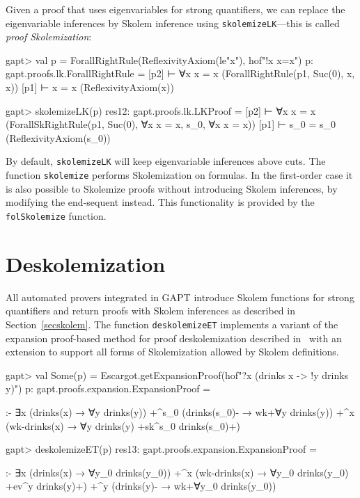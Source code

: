 \documentclass[a4paper,11pt]{book}
\begin{document}
Given a proof that uses eigenvariables for strong quantifiers, we can replace
the eigenvariable inferences by Skolem inference using
\texttt{skolemizeLK}---this is called \emph{proof Skolemization}:
\begin{clilisting}
gapt> val p = ForallRightRule(ReflexivityAxiom(le"x"), hof"!x x=x")
p: gapt.proofs.lk.ForallRightRule =
[p2]  ⊢ ∀x x = x    (ForallRightRule(p1, Suc(0), x, x))
[p1]  ⊢ x = x    (ReflexivityAxiom(x))

gapt> skolemizeLK(p)
res12: gapt.proofs.lk.LKProof =
[p2]  ⊢ ∀x x = x    (ForallSkRightRule(p1, Suc(0), ∀x x = x, s_0, ∀x x = x))
[p1]  ⊢ s_0 = s_0    (ReflexivityAxiom(s_0))

\end{clilisting}

By default, \texttt{skolemizeLK} will keep eigenvariable inferences above cuts.
The function \texttt{skolemize} performs Skolemization on formulas.
In the first-order case it is also possible to Skolemize proofs without
introducing Skolem inferences, by modifying the end-sequent instead.  This
functionality is provided by the \texttt{folSkolemize} function.

\section{Deskolemization}

All automated provers integrated in GAPT introduce Skolem functions for strong
quantifiers and return proofs with Skolem inferences as described in
Section~\ref{secskolem}.  The function \texttt{deskolemizeET} implements a
variant of the expansion proof-based method for proof deskolemization
described in~\cite{Baaz2012Complexity} with an extension to support all forms
of Skolemization allowed by Skolem definitions.
\begin{clilisting}
gapt> val Some(p) = Escargot.getExpansionProof(hof"?x (drinks x -> !y drinks y)")
p: gapt.proofs.expansion.ExpansionProof =

:-
∃x (drinks(x) → ∀y drinks(y))
  +^{s_0} (drinks(s_0)- → wk+{∀y drinks(y)})
  +^{x} (wk-{drinks(x)} → ∀y drinks(y) +sk^{s_0} drinks(s_0)+)

gapt> deskolemizeET(p)
res13: gapt.proofs.expansion.ExpansionProof =

:-
∃x (drinks(x) → ∀y_0 drinks(y_0))
  +^{x} (wk-{drinks(x)} → ∀y_0 drinks(y_0) +ev^{y} drinks(y)+)
  +^{y} (drinks(y)- → wk+{∀y_0 drinks(y_0)})

\end{clilisting}
\end{document}
